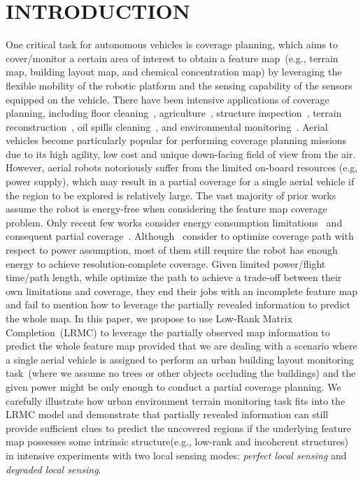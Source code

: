 \section{INTRODUCTION}
One critical task for autonomous vehicles is coverage planning, which aims to cover/monitor a certain area of interest to obtain a feature map~(e.g., terrain map, building layout map, and chemical concentration map) by leveraging the flexible mobility of the robotic platform and the sensing capability of the sensors equipped on the vehicle. There have been intensive applications of coverage planning, including floor cleaning~\cite{oh2004complete, palacin2004building}, agriculture~\cite{hameed2013optimized, zhou2014agricultural, jin2010optimal}, structure inspection~\cite{englot2012sampling, ellefsen2017multiobjective}, terrain reconstruction~\cite{krotkov1994terrain, torres2016coverage}, oil spills cleaning~\cite{song2013adaptive}, and environmental monitoring~\cite{he2019autonomous}. Aerial vehicles become particularly popular for performing coverage planning missions due to its high agility, low cost and unique down-facing field of view from the air. However, aerial robots notoriously suffer from the limited on-board resources (e.g, power supply), which may result in a partial coverage for a single aerial vehicle if the region to be explored is relatively large. The vast majority of prior works assume the robot is energy-free when considering the feature map coverage problem. Only recent few works consider energy consumption limitations~\cite{di2016coverage, modares2017ub, cabreira2018energy} and consequent partial coverage~\cite{ellefsen2017multiobjective, papachristos2016distributed, jensen2020near}. Although~\cite{di2016coverage, modares2017ub, cabreira2018energy} consider to optimize coverage path with respect to power assumption, most of them still require the robot has enough energy to achieve resolution-complete coverage. Given limited power/flight time/path length, while \cite{di2016coverage, modares2017ub, cabreira2018energy} optimize the path to achieve a trade-off between their own limitations and coverage, they end their jobs with an incomplete feature map and fail to mention how to leverage the partially revealed information to predict the whole map. In this paper, we propose to use Low-Rank Matrix Completion~(LRMC) to leverage the partially observed map information to predict the whole feature map provided that we are dealing with a scenario where a single aerial vehicle is assigned to perform an urban building layout monitoring task~(where we assume no trees or other objects occluding the buildings) and the given power might be only enough to conduct a partial coverage planning. We carefully illustrate how urban environment terrain monitoring task fits into the LRMC model and demonstrate that partially revealed information can still provide sufficient clues to predict the uncovered regions if the underlying feature map possesses some intrinsic structure(e.g., low-rank and incoherent structures) in intensive experiments with two local sensing modes: \textit{perfect local sensing} and \textit{degraded local sensing}.

